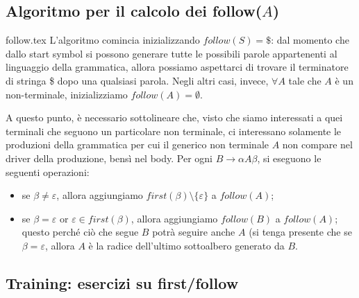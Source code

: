 \documentclass[class=book, crop=false, oneside, 12pt]{standalone}
\begin{document}
\subsection{Algoritmo per il calcolo dei follow(\(A\))}
{follow.tex}
L'algoritmo comincia inizializzando \(follow(S) = \$\): dal momento che dallo start symbol si possono generare tutte le possibili parole appartenenti al linguaggio della grammatica, allora possiamo aspettarci di trovare il terminatore di stringa \$ dopo una qualsiasi parola. Negli altri casi, invece, \(\forall A\) tale che \(A\) è un non-terminale, inizializziamo \(follow(A) = \emptyset\).

A questo punto, è necessario sottolineare che, visto che siamo interessati a quei terminali che seguono un particolare non terminale, ci interessano solamente le produzioni della grammatica per cui il generico non terminale \(A\) non compare nel driver della produzione, bensì nel body. Per ogni \(B \rightarrow \alpha A \beta\), si eseguono le seguenti operazioni: 

\begin{itemize}
    \item se \(\beta \neq \varepsilon\), allora aggiungiamo \(first(\beta) \setminus \{\varepsilon\}\) a \(follow(A)\);
    \item se \(\beta = \varepsilon\) or \(\varepsilon \in first(\beta)\), allora aggiungiamo \(follow(B)\) a \(follow(A)\); questo perché ciò che segue \(B\) potrà seguire anche \(A\) (si tenga presente che se \(\beta = \varepsilon\), allora \(A\) è la radice dell'ultimo sottoalbero generato da \(B\).
\end{itemize}   
\subsection{Training: esercizi su first/follow}
\end{document}
